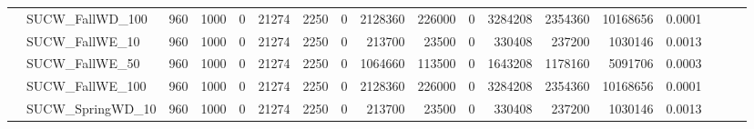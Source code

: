 \begin{landscape}
\begin{longtable}[c]{llrrrrrrrrrrrrrlll}
		& SUCW\_FallWD\_100            & 960                         & 1000                       & 0                          & 21274                       & 2250                       & 0                          & 2128360                    & 226000                    & 0                         & 3284208                    & 2354360                    & 10168656                       & 0.0001                        &                          &                          &                          \\
		& SUCW\_FallWE\_10             & 960                         & 1000                       & 0                          & 21274                       & 2250                       & 0                          & 213700                     & 23500                     & 0                         & 330408                     & 237200                     & 1030146                        & 0.0013                        &                          &                          &                          \\
		& SUCW\_FallWE\_50             & 960                         & 1000                       & 0                          & 21274                       & 2250                       & 0                          & 1064660                    & 113500                    & 0                         & 1643208                    & 1178160                    & 5091706                        & 0.0003                        &                          &                          &                          \\
		& SUCW\_FallWE\_100            & 960                         & 1000                       & 0                          & 21274                       & 2250                       & 0                          & 2128360                    & 226000                    & 0                         & 3284208                    & 2354360                    & 10168656                       & 0.0001                        &                          &                          &                          \\
		& SUCW\_SpringWD\_10           & 960                         & 1000                       & 0                          & 21274                       & 2250                       & 0                          & 213700                     & 23500                     & 0                         & 330408                     & 237200                     & 1030146                        & 0.0013                        &                          &                          &                          \\

\end{longtable}
\end{landscape}
